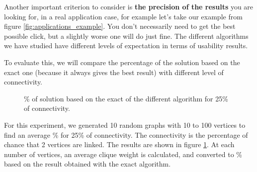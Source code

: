 Another important criterion to consider is \textbf{the precision of the results} you are looking for, in a real application case, for example let's take our example from figure \ref{fig:applications_example}. You don't necessarily need to get the best possible click, but a slightly worse one will do just fine. The different algorithms we have studied have different levels of expectation in terms of usability results. \bigskip

To evaluate this, we will compare the percentage of the solution based on the exact one (because it always gives the best result) with different level of connectivity. \bigskip

\begin{figure}[H]
    \centering
    \caption{\% of solution based on the exact of the different algorithm for 25\% of connectivity.}
    \label{fig:algorithm_25_accuracy}
\end{figure}


For this experiment, we generated 10 random graphs with 10 to 100 vertices to find an average \% for 25\% of connectivity. The connectivity is the percentage of chance that 2 vertices are linked. The results are shown in figure \ref{fig:algorithm_25_accuracy}. At each number of vertices, an average clique weight is calculated, and converted to \% based on the result obtained with the exact algorithm. \bigskip

